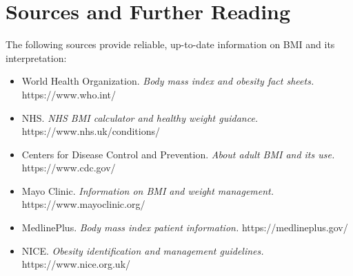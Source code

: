 \section*{Sources and Further Reading}
The following sources provide reliable, up-to-date information on BMI and its interpretation:

\begin{itemize}
    \item World Health Organization. \textit{Body mass index and obesity fact sheets.} https://www.who.int/
    \item NHS. \textit{NHS BMI calculator and healthy weight guidance.} https://www.nhs.uk/conditions/
    \item Centers for Disease Control and Prevention. \textit{About adult BMI and its use.} https://www.cdc.gov/
    \item Mayo Clinic. \textit{Information on BMI and weight management.} https://www.mayoclinic.org/
    \item MedlinePlus. \textit{Body mass index patient information.} https://medlineplus.gov/
    \item NICE. \textit{Obesity identification and management guidelines.} https://www.nice.org.uk/
\end{itemize}
